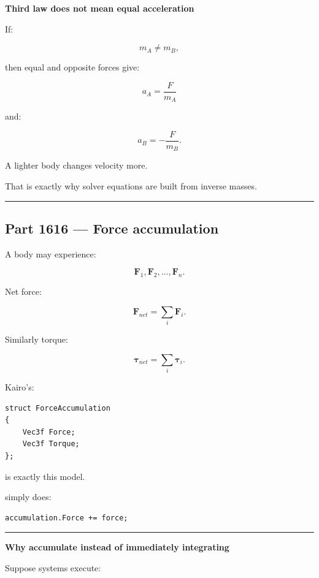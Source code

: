 \textbf{Third law does not mean equal acceleration}

If:

\[
m_A\neq m_B,
\]

then equal and opposite forces give:

\[
a_A=\frac{F}{m_A}
\]

and:

\[
a_B=-\frac{F}{m_B}.
\]

A lighter body changes velocity more.

That is exactly why solver equations are built from inverse masses.

\begin{center}\rule{0.5\linewidth}{0.5pt}\end{center}

\subsection{Part 1616 --- Force accumulation}\label{06-engine-ii-ch034-part-1616-force-accumulation}

\hypertarget{06-engine-ii-ch034-part-1616-force-accumulation}{}

A body may experience:

\[
\mathbf{F}_1,
\mathbf{F}_2,\dots,\mathbf{F}_n.
\]

Net force:

\[
\boxed{
\mathbf{F}_{net}
=
\sum_i
\mathbf{F}_i.
}
\]

Similarly torque:

\[
\boldsymbol{\tau}_{net}
=
\sum_i
\boldsymbol{\tau}_i.
\]

Kairo's:

\begin{verbatim}
struct ForceAccumulation
{
    Vec3f Force;
    Vec3f Torque;
};
\end{verbatim}

is exactly this model.

 simply does:

\begin{verbatim}
accumulation.Force += force;
\end{verbatim}

\begin{center}\rule{0.5\linewidth}{0.5pt}\end{center}

\textbf{Why accumulate instead of immediately integrating}

Suppose systems execute:

